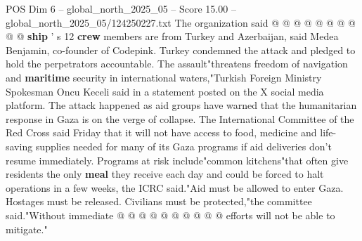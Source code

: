 \begin{textsample}{POS Dim 6 – global\_north\_2025\_05 – Score 15.00 – global\_north\_2025\_05/124250227.txt}
The organization said @ @ @ @ @ @ @ @ @ @ \textbf{ship} ' s 12 \textbf{crew} members are from Turkey and Azerbaijan, said Medea Benjamin, co-founder of Codepink.
Turkey condemned the attack and pledged to hold the perpetrators accountable.
The assault"threatens freedom of navigation and \textbf{maritime} security in international waters,"Turkish Foreign Ministry Spokesman Oncu Keceli said in a statement posted on the X social media platform.
The attack happened as aid groups have warned that the humanitarian response in Gaza is on the verge of collapse.
The International Committee of the Red Cross said Friday that it will not have access to food, medicine and life-saving supplies needed for many of its Gaza programs if aid deliveries don't resume immediately.
Programs at risk include"common kitchens"that often give residents the only \textbf{meal} they receive each day and could be forced to halt operations in a few weeks, the ICRC said."Aid must be allowed to enter Gaza.
Hostages must be released.
Civilians must be protected,"the committee said."Without immediate @ @ @ @ @ @ @ @ @ @ efforts will not be able to mitigate."

\end{textsample}

